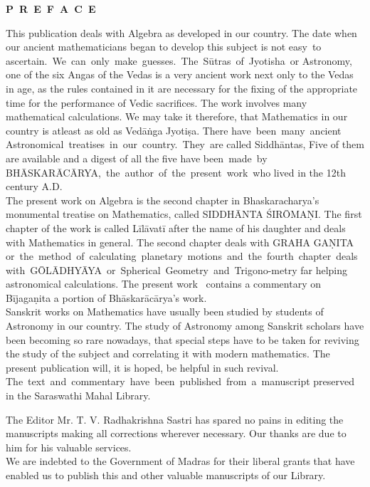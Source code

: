 \documentclass[11pt, openany]{book}
\begin{document}
{\englishfont\begin{center}
    \textbf{\LARGE P~R~E~F~A~C~E}
\end{center}

This publication deals with Algebra as developed in our
country. The date when our ancient mathematicians began
to develop this subject is not easy\, to \,ascertain. \,We \,can \,only \,make \,guesses. \,The \,Sūtras \,of \,Jyotisha \,or Astronomy, one of
the six Angas of the Vedas is a very ancient work next only
to the Vedas in age, as the rules contained in it are necessary
for the fixing of the appropriate time for the performance of
Vedic sacrifices. The work involves many mathematical calculations. We may take it therefore, that Mathematics in our
country is atleast as old as Vedāṅga Jyotiṣa. There have \,been \,many \,ancient \,Astronomical \,treatises \,in \,our \,country. \,They \,are called Siddhāntas, Five of them are available and
a digest of all the five have been \,made \,by \,BHĀSKARĀCĀRYA, \,the \,author \,of \,the \,present \,work \,who lived in the
12th century A.D.\\

\vspace{-3mm}
 The present work on Algebra is the second chapter in
Bhaskaracharya's monumental treatise on Mathematics, called
SIDDHĀNTA ŚIRŌMAṆI. The first chapter of the work is
called Līlāvatī after the name of his daughter and deals with
Mathematics in general. The second chapter deals with
GRAHA GAṆITA \,or \,the \,method \,of \,calculating \,planetary \,motions \,and \,the \,fourth \,chapter \,deals \,with \,GŌLĀDHYĀYA \,or \,Spherical \,Geometry \,and \,Trigono-metry far helping~ astronomical calculations. The present work~ contains a commentary
on Bījagaṇita a portion of Bhāskarācārya's work.\\

\vspace{-3mm}
Sanskrit works on Mathematics have usually been
studied by students of Astronomy in our country. The study
of Astronomy among Sanskrit scholars have been becoming
so rare nowadays, that special steps have to be taken for
reviving the study of the subject and correlating it with
modern mathematics. The present publication will, it is
hoped, be helpful in such revival.\\

\vspace{-3mm}
The \,text \,and \,commentary \,have \,been \,published \,from \,a \,manuscript preserved in the Saraswathi Mahal Library.}
\afterpage{\fancyhead[CE,CO]{\thepage}}
\cfoot{}
\newpage
\setcounter{page}{2}
{\englishfont
The Editor Mr. T. V. Radhakrishna Sastri has spared no
pains in editing the manuscripts making all corrections
wherever necessary. Our thanks are due to him for his
valuable services.\\

\vspace{-3mm}
We are indebted to the Government of Madras for their 
liberal grants that have enabled us to publish this and other
valuable manuscripts of our Library.}
\end{document}
